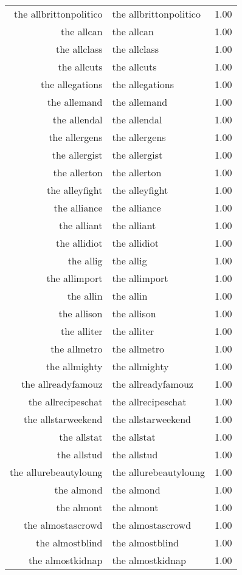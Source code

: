 \begin{table}[ht]
\begin{tabular}{rlr}
  the allbrittonpolitico & the allbrittonpolitico & 1.00 \\ 
  the allcan & the allcan & 1.00 \\ 
  the allclass & the allclass & 1.00 \\ 
  the allcuts & the allcuts & 1.00 \\ 
  the allegations & the allegations & 1.00 \\ 
  the allemand & the allemand & 1.00 \\ 
  the allendal & the allendal & 1.00 \\ 
  the allergens & the allergens & 1.00 \\ 
  the allergist & the allergist & 1.00 \\ 
  the allerton & the allerton & 1.00 \\ 
  the alleyfight & the alleyfight & 1.00 \\ 
  the alliance & the alliance & 1.00 \\ 
  the alliant & the alliant & 1.00 \\ 
  the allidiot & the allidiot & 1.00 \\ 
  the allig & the allig & 1.00 \\ 
  the allimport & the allimport & 1.00 \\ 
  the allin & the allin & 1.00 \\ 
  the allison & the allison & 1.00 \\ 
  the alliter & the alliter & 1.00 \\ 
  the allmetro & the allmetro & 1.00 \\ 
  the allmighty & the allmighty & 1.00 \\ 
  the allreadyfamouz & the allreadyfamouz & 1.00 \\ 
  the allrecipeschat & the allrecipeschat & 1.00 \\ 
  the allstarweekend & the allstarweekend & 1.00 \\ 
  the allstat & the allstat & 1.00 \\ 
  the allstud & the allstud & 1.00 \\ 
  the allurebeautyloung & the allurebeautyloung & 1.00 \\ 
  the almond & the almond & 1.00 \\ 
  the almont & the almont & 1.00 \\ 
  the almostascrowd & the almostascrowd & 1.00 \\ 
  the almostblind & the almostblind & 1.00 \\ 
  the almostkidnap & the almostkidnap & 1.00 \\ 

\end{tabular}
\end{table}
